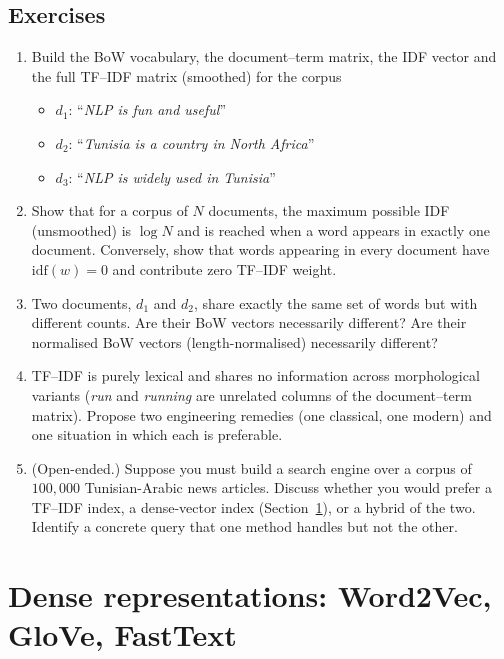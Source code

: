 \subsection{Exercises}
\begin{enumerate}
    \item Build the BoW vocabulary, the document--term matrix, the IDF vector and the full TF--IDF matrix (smoothed) for the corpus
    \begin{itemize}
        \item $d_1$: ``\emph{NLP is fun and useful}''
        \item $d_2$: ``\emph{Tunisia is a country in North Africa}''
        \item $d_3$: ``\emph{NLP is widely used in Tunisia}''
    \end{itemize}
    \item Show that for a corpus of $N$ documents, the maximum possible IDF (unsmoothed) is $\log N$ and is reached when a word appears in exactly one document. Conversely, show that words appearing in every document have $\mathrm{idf}(w) = 0$ and contribute zero TF--IDF weight.
    \item Two documents, $d_1$ and $d_2$, share exactly the same set of words but with different counts. Are their BoW vectors necessarily different? Are their normalised BoW vectors (length-normalised) necessarily different?
    \item TF--IDF is purely lexical and shares no information across morphological variants (\emph{run} and \emph{running} are unrelated columns of the document--term matrix). Propose two engineering remedies (one classical, one modern) and one situation in which each is preferable.
    \item (Open-ended.) Suppose you must build a search engine over a corpus of $100{,}000$ Tunisian-Arabic news articles. Discuss whether you would prefer a TF--IDF index, a dense-vector index (Section~\ref{sec:dense}), or a hybrid of the two. Identify a concrete query that one method handles but not the other.
\end{enumerate}

\section{Dense representations: Word2Vec, GloVe, FastText}
\label{sec:dense}

